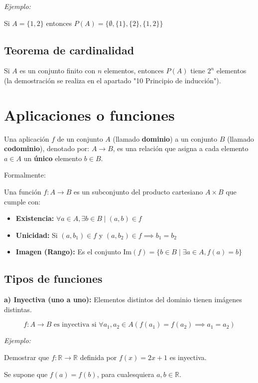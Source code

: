 \documentclass{article}
\begin{document}
\textit{Ejemplo:}

Si $A = \{1, 2\}$ entonces $P(A) = \{\emptyset, \{1\}, \{2\}, \{1, 2\} \}$

\subsection{Teorema de cardinalidad} Si $A$ es un conjunto finito con $n$ elementos, entonces $P(A)$ tiene $2^n$ elementos (la demostración se realiza en el apartado "10 Principio de inducción").

\section{Aplicaciones o funciones}

Una aplicación $f$ de un conjunto $A$ (llamado \textbf{dominio}) a un conjunto $B$ (llamado \textbf{codominio}), denotado por: $A \to B$, es una relación que asigna a cada elemento $a \in A$ un \textbf{único} elemento $b \in B$.

Formalmente:

Una función $f: A \to B$ es un subconjunto del producto cartesiano $A \times B$ que cumple con:

\begin{itemize}
    \item \textbf{Existencia:} $\forall a \in A, \exists b \in B \mid (a,b) \in f$
    \item \textbf{Unicidad:} Si $(a, b_1) \in f$ y $(a, b_2) \in f \implies b_1 = b_2$
    \item \textbf{Imagen (Rango):} Es el conjunto $\text{Im}(f) = \{b \in B \mid \exists a \in A, f(a) = b\}$
\end{itemize}

\subsection{Tipos de funciones}

\textbf{a) Inyectiva (uno a uno):} Elementos distintos del dominio tienen imágenes distintas.
    
\[f: A \to B \text{ es inyectiva si } \forall a_1, a_2 \in A (f(a_1) = f(a_2) \implies a_1 = a_2)\]

\textit{Ejemplo:}

Demostrar que $f: \mathbb{R} \to \mathbb{R}$ definida por $f(x) = 2x + 1$ es inyectiva.

Se supone que $f(a) = f(b)$, para cualesquiera $a, b \in \mathbb{R}$.
\end{document}
